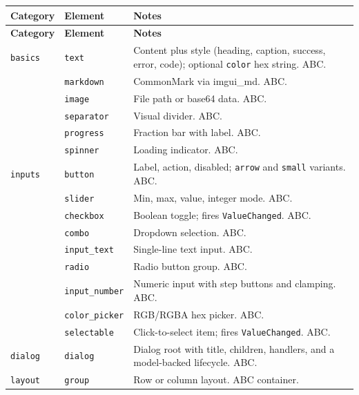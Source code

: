 \documentclass[a4paper,10pt]{article}
\newcommand{\elem}[1]{\texttt{#1}}
\newcommand{\field}[1]{\texttt{#1}}
\begin{document}
\begin{longtable}{llp{6cm}}
\toprule
\textbf{Category} & \textbf{Element} & \textbf{Notes} \\
\midrule
\endfirsthead
\toprule
\textbf{Category} & \textbf{Element} & \textbf{Notes} \\
\midrule
\endhead
\texttt{basics}    & \elem{text}              & Content plus style
              (heading, caption, success, error, code); optional
              \field{color} hex string.  ABC. \\
            & \elem{markdown}          & CommonMark via imgui\_md.  ABC. \\
            & \elem{image}             & File path or base64 data.  ABC. \\
            & \elem{separator}         & Visual divider.  ABC. \\
            & \elem{progress}          & Fraction bar with label.  ABC. \\
            & \elem{spinner}           & Loading indicator.  ABC. \\
\midrule
\texttt{inputs}    & \elem{button}            & Label, action, disabled;
              \field{arrow} and \field{small} variants.  ABC. \\
            & \elem{slider}            & Min, max, value, integer mode.
              ABC. \\
            & \elem{checkbox}          & Boolean toggle; fires
              \texttt{ValueChanged}.  ABC. \\
            & \elem{combo}             & Dropdown selection.  ABC. \\
            & \elem{input\_text}       & Single-line text input.  ABC. \\
            & \elem{radio}             & Radio button group.  ABC. \\
            & \elem{input\_number}     & Numeric input with step buttons and
              clamping.  ABC. \\
            & \elem{color\_picker}     & RGB/RGBA hex picker.  ABC. \\
            & \elem{selectable}        & Click-to-select item; fires
              \texttt{ValueChanged}.  ABC. \\
\midrule
\texttt{dialog}    & \elem{dialog}            & Dialog root with title,
              children, handlers, and a model-backed lifecycle.  ABC. \\
\midrule
\texttt{layout}    & \elem{group}             & Row or column layout.
              ABC container. \\

\end{longtable}
\end{document}
